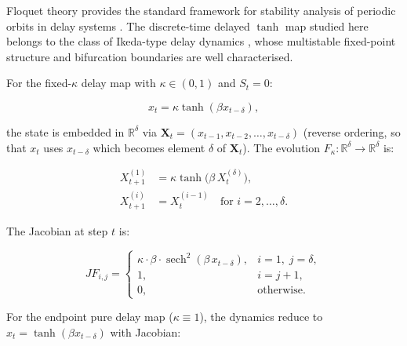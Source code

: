\documentclass[12pt,a4paper]{article}
\newcommand{\R}{\mathbb{R}}
\begin{document}
\label{sec:stability_frozen_kappa}

Floquet theory provides the standard framework for stability analysis of periodic orbits in delay systems \cite{strogatz2015nonlinear, izhikevich2007dynamical}. The discrete-time delayed $\tanh$ map studied here belongs to the class of Ikeda-type delay dynamics \cite{ikeda1979multiple, yanchuk2009delayed}, whose multistable fixed-point structure and bifurcation boundaries are well characterised.



For the fixed-$\kappa$ delay map with $\kappa \in (0,1)$ and $S_t=0$:

\begin{equation}

x_t = \kappa \tanh(\beta x_{t-\delta}),

\end{equation}

the state is embedded in $\R^{\delta}$ via $\mathbf{X}_t = (x_{t-1}, x_{t-2}, \ldots, x_{t-\delta})$ (reverse ordering, so that $x_t$ uses $x_{t-\delta}$ which becomes element $\delta$ of $\mathbf{X}_t$). The evolution $F_\kappa: \R^{\delta} \to \R^{\delta}$ is:

\begin{align}
X^{(1)}_{t+1} &= \kappa \tanh\bigl(\beta\, X^{(\delta)}_t\bigr), \\
X^{(i)}_{t+1} &= X^{(i-1)}_t \quad \text{for } i = 2,\ldots,\delta.
\end{align}

The Jacobian at step $t$ is:

\begin{equation}

JF_{i,j} = 

\begin{cases}

\kappa \cdot \beta \cdot \operatorname{sech}^2(\beta \, x_{t-\delta}), & i=1,\; j=\delta,\\

1, & i = j+1,\\

0, & \text{otherwise}.

\end{cases}

\label{eq:jacobian_fixed_kappa}

\end{equation}



For the endpoint pure delay map ($\kappa \equiv 1$), the dynamics reduce to $x_t = \tanh(\beta x_{t-\delta})$ with Jacobian:
\end{document}
